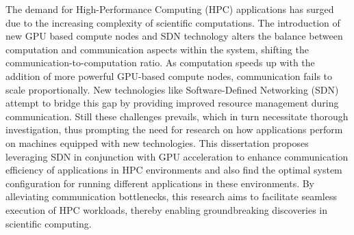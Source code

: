 The demand for High-Performance Computing (HPC) applications has surged due to
the increasing complexity of scientific computations. The introduction of
new GPU based compute nodes and SDN technology alters the balance between
computation and communication aspects within the system, shifting the
communication-to-computation ratio. As computation speeds up with the addition
of more powerful GPU-based compute nodes, communication fails to scale
proportionally. New technologies like Software-Defined Networking (SDN) attempt
to bridge this gap by providing improved resource management during
communication. Still these challenges prevails, which in turn necessitate thorough investigation, thus
prompting the need for research on how applications perform on machines equipped
with new technologies. This dissertation proposes leveraging SDN in conjunction
with GPU acceleration to enhance communication efficiency of applications in HPC
environments and also find the optimal system configuration for running
different applications in these environments. By alleviating communication
bottlenecks, this research aims to facilitate seamless execution of HPC
workloads, thereby enabling groundbreaking discoveries in scientific computing.
